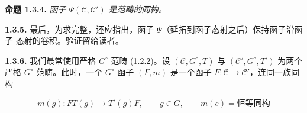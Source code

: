 \noindent\textbf{命题 1.3.4.}\quad
\emph{函子 $\Psi(\mathcal C,\mathcal C')$ 是范畴的同构。}

\noindent\textbf{1.3.5.}\quad
最后，为求完整，还应指出，函子 $\Psi$（延拓到函子态射之后）保持函子沿函子
态射的卷积。验证留给读者。

\noindent\textbf{1.3.6.}\quad
我们最常使用严格 $G^\circ$-范畴 (1.2.2)。设
$(\mathcal C,G^\circ,T)$ 与 $(\mathcal C',G^\circ,T')$ 为两个严格
$G^\circ$-范畴。此时，一个 $G^\circ$-函子 $(F,m)$ 是一个函子
$F\colon\mathcal C\to\mathcal C'$，连同一族同构

\begin{equation}
  m(g)\colon FT(g)\longrightarrow T'(g)F,
  \qquad g\in G,
  \qquad m(e)=\text{恒等同构}
  \tag{1.3.6.1}
\end{equation}
